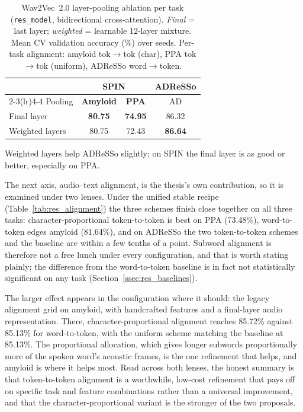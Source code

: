 \begin{table}[htbp]
\centering
\caption[Wav2Vec layer-pooling ablation per task]{Wav2Vec~2.0 layer-pooling ablation per task (\texttt{res\_model}, bidirectional cross-attention). \emph{Final} = last layer; \emph{weighted} = learnable 12-layer mixture. Mean CV validation accuracy (\%) over seeds. Per-task alignment: amyloid tok$\rightarrow$tok (char), PPA tok$\rightarrow$tok (uniform), ADReSSo word$\rightarrow$token.}
\label{tab:res_wav2vec_pool}
\small
\begin{tabular}{lccc}
\toprule
 & \multicolumn{2}{c}{\textbf{SPIN}} & \textbf{ADReSSo} \\
\cmidrule(lr){2-3}\cmidrule(lr){4-4}
Pooling & \textbf{Amyloid} & \textbf{PPA} & AD \\
\midrule
Final layer     & \textbf{80.75} & \textbf{74.95} & 86.32 \\
Weighted layers & 80.75 & 72.43 & \textbf{86.64} \\
\bottomrule
\end{tabular}

\vspace{2pt}
{\footnotesize Weighted layers help ADReSSo slightly; on SPIN the final layer is as good or better, especially on PPA.}
\end{table}

The next axis, audio--text alignment, is the thesis's own contribution, so it is examined under two lenses. Under the unified stable recipe (Table~\ref{tab:res_alignment}) the three schemes finish close together on all three tasks: character-proportional token-to-token is best on PPA (73.48\%), word-to-token edges amyloid (81.64\%), and on ADReSSo the two token-to-token schemes and the baseline are within a few tenths of a point. Subword alignment is therefore not a free lunch under every configuration, and that is worth stating plainly; the difference from the word-to-token baseline is in fact not statistically significant on any task (Section~\ref{ssec:res_baselines}).

The larger effect appears in the configuration where it should: the legacy alignment grid on amyloid, with handcrafted features and a final-layer audio representation. There, character-proportional alignment reaches 85.72\% against 85.13\% for word-to-token, with the uniform scheme matching the baseline at 85.13\%. The proportional allocation, which gives longer subwords proportionally more of the spoken word's acoustic frames, is the one refinement that helps, and amyloid is where it helps most. Read across both lenses, the honest summary is that token-to-token alignment is a worthwhile, low-cost refinement that pays off on specific task and feature combinations rather than a universal improvement, and that the character-proportional variant is the stronger of the two proposals.

